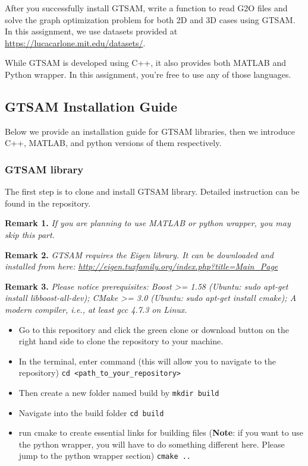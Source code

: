 \documentclass[tp]{lcc}
\begin{document}
After you successfully install GTSAM, write a function to read G2O files and solve the graph optimization problem for both 2D and 3D cases using GTSAM. In this assignment, we use datasets provided at \url{https://lucacarlone.mit.edu/datasets/}.

While GTSAM is developed using C++, it also provides both MATLAB and Python wrapper. In this assignment, you’re free to use any of those languages.

\subsection{GTSAM Installation Guide}
Below we provide an installation guide for GTSAM libraries, then we introduce C++, MATLAB, and python versions of them respectively.

\subsubsection{GTSAM library}
The first step is to clone and install GTSAM library. Detailed instruction can be found in the repository.

\textbf{Remark 1.} \textit{If you are planning to use MATLAB or python wrapper, you may skip this part.}

\textbf{Remark 2.} \textit{GTSAM requires the Eigen library. It can be downloaded and installed from here: \url{http://eigen.tuxfamily.org/index.php?title=Main_Page}}

\textbf{Remark 3.} \textit{Please notice prerequisites: Boost >= 1.58 (Ubuntu: sudo apt-get install libboost-all-dev); CMake >= 3.0 (Ubuntu: sudo apt-get install cmake); A modern compiler, i.e., at least gcc 4.7.3 on Linux.}

\begin{itemize}
    \item Go to this repository and click the green clone or download button on the right hand side to clone the repository to your machine.
    \item In the terminal, enter command (this will allow you to navigate to the repository) \texttt{cd <path\_to\_your\_repository>}
    \item Then create a new folder named build by \texttt{mkdir build}
    \item Navigate into the build folder \texttt{cd build}
    \item run cmake to create essential links for building files (\textbf{Note}: if you want to use the python wrapper, you will have to do something different here. Please jump to the python wrapper section) \texttt{cmake ..}
\end{itemize}
\end{document}
